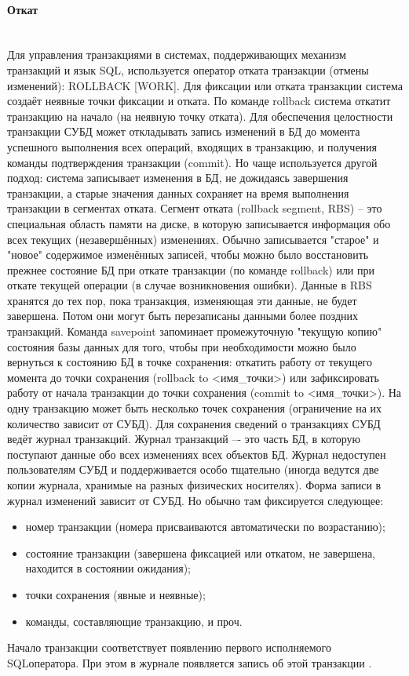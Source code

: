 \paragraph{Откат} ~\\
Для управления транзакциями в системах, поддерживающих механизм
транзакций и язык SQL, используется оператор отката транзакции (отмены изменений): ROLLBACK [WORK]. Для фиксации или отката транзакции
система создаёт неявные точки фиксации и отката.
По команде rollback система откатит транзакцию на начало (на неявную точку
отката).
Для обеспечения целостности транзакции СУБД может откладывать запись
изменений в БД до момента успешного выполнения всех операций, входящих в
транзакцию, и получения команды подтверждения транзакции (commit). Но
чаще используется другой подход: система записывает изменения в БД, не
дожидаясь завершения транзакции, а старые значения данных сохраняет на
время выполнения транзакции в сегментах отката.
Сегмент отката (rollback segment, RBS) – это специальная область памяти на
диске, в которую записывается информация обо всех текущих (незавершённых)
изменениях. Обычно записывается "старое" и "новое" содержимое изменённых
записей, чтобы можно было восстановить прежнее состояние БД при откате
транзакции (по команде rollback) или при откате текущей операции (в случае
возникновения ошибки). Данные в RBS хранятся до тех пор, пока транзакция,
изменяющая эти данные, не будет завершена. Потом они могут быть
перезаписаны данными более поздних транзакций.
Команда savepoint запоминает промежуточную "текущую копию" состояния
базы данных для того, чтобы при необходимости можно было вернуться к
состоянию БД в точке сохранения: откатить работу от текущего момента до
точки сохранения (rollback to <имя\_точки>) или зафиксировать работу от начала
транзакции до точки сохранения (commit to <имя\_точки>). На одну транзакцию
может быть несколько точек сохранения (ограничение на их количество зависит
от СУБД).
Для сохранения сведений о транзакциях СУБД ведёт журнал
транзакций. Журнал транзакций –- это часть БД, в которую поступают данные
обо всех изменениях всех объектов БД. Журнал недоступен пользователям
СУБД и поддерживается особо тщательно (иногда ведутся две копии журнала,
хранимые на разных физических носителях). Форма записи в журнал изменений
зависит от СУБД. Но обычно там фиксируется следующее:
\begin{itemize}
\item номер транзакции (номера присваиваются автоматически по возрастанию);
\item состояние транзакции (завершена фиксацией или откатом, не завершена,
находится в состоянии ожидания);
\item точки сохранения (явные и неявные);
\item команды, составляющие транзакцию, и проч.
\end{itemize}
Начало транзакции соответствует появлению первого исполняемого SQLоператора. При этом в журнале появляется запись об этой транзакции \autocite{Karpova2009}.

